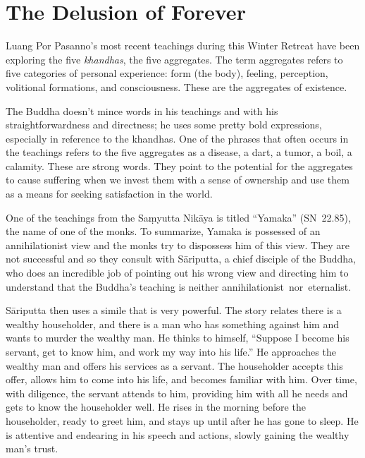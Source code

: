 
\chapter{The Delusion of Forever}


Luang Por Pasanno's most recent teachings during this Winter Retreat have been exploring the five \emph{khandhas}, the five aggregates. The term aggregates refers to five categories of personal experience: form (the body), feeling, perception, volitional formations, and consciousness. These are the aggregates of existence.

The Buddha doesn't mince words in his teachings and with his straightforwardness and directness; he uses some pretty bold expressions, especially in reference to the khandhas. One of the phrases that often occurs in the teachings refers to the five aggregates as a disease, a dart, a tumor, a boil, a calamity. These are strong words. They point to the potential for the aggregates to cause suffering when we invest them with a sense of ownership and use them as a means for seeking satisfaction in the world.

One of the teachings from the Saṃyutta Nikāya is titled ``Yamaka'' \mbox{(SN 22.85)}, the name of one of the monks. To summarize, Yamaka is possessed of an annihilationist view and the monks try to dispossess him of this view. They are not successful and so they consult with Sāriputta, a chief disciple of the Buddha, who does an incredible job of pointing out his wrong view and directing him to understand that the Buddha's teaching is neither \mbox{annihilationist nor eternalist.}

Sāriputta then uses a simile that is very powerful. The story relates there is a wealthy householder, and there is a man who has something against him and wants to murder the wealthy man. He thinks to himself, ``Suppose I become his servant, get to know him, and work my way into his life.'' He approaches the wealthy man and offers his services as a servant. The householder accepts this offer, allows him to come into his life, and becomes familiar with him. Over time, with diligence, the servant attends to him, providing him with all he needs and gets to know the householder well. He rises in the morning before the householder, ready to greet him, and stays up until after he has gone to sleep. He is attentive and endearing in his speech and actions, slowly gaining the wealthy man's trust.

